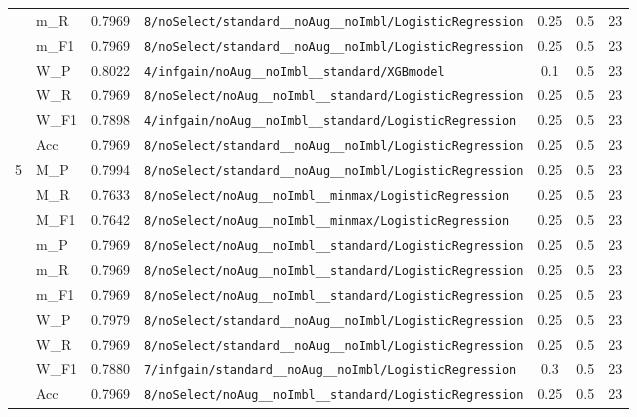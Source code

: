 \begin{table}[htbp]
\begin{tabular}{|c|l|c|>{\ttfamily\footnotesize}p{7.2cm}|c|c|c|}
 & m\_R & 0.7969 & \texttt{8/noSelect/standard\_\_noAug\_\_noImbl/LogisticRegression} & 0.25 & 0.5  & 23 \\ 
 & m\_F1 & 0.7969 & \texttt{8/noSelect/standard\_\_noAug\_\_noImbl/LogisticRegression} & 0.25 & 0.5  & 23 \\ 
 & W\_P & 0.8022 & \texttt{4/infgain/noAug\_\_noImbl\_\_standard/XGBmodel} & 0.1 & 0.5  & 23 \\ 
 & W\_R & 0.7969 & \texttt{8/noSelect/noAug\_\_noImbl\_\_standard/LogisticRegression} & 0.25 & 0.5  & 23 \\ 
 & W\_F1 & 0.7898 & \texttt{4/infgain/noAug\_\_noImbl\_\_standard/LogisticRegression} & 0.25 & 0.5  & 23 \\ 
 & Acc & 0.7969 & \texttt{8/noSelect/standard\_\_noAug\_\_noImbl/LogisticRegression} & 0.25 & 0.5  & 23 \\ 
\hline
\multirow{10}{*}{5} & M\_P & 0.7994 & \texttt{8/noSelect/standard\_\_noAug\_\_noImbl/LogisticRegression} & 0.25 & 0.5  & 23 \\ 
 & M\_R & 0.7633 & \texttt{8/noSelect/noAug\_\_noImbl\_\_minmax/LogisticRegression} & 0.25 & 0.5  & 23 \\ 
 & M\_F1 & 0.7642 & \texttt{8/noSelect/noAug\_\_noImbl\_\_minmax/LogisticRegression} & 0.25 & 0.5  & 23 \\ 
 & m\_P & 0.7969 & \texttt{8/noSelect/noAug\_\_noImbl\_\_standard/LogisticRegression} & 0.25 & 0.5  & 23 \\ 
 & m\_R & 0.7969 & \texttt{8/noSelect/noAug\_\_noImbl\_\_standard/LogisticRegression} & 0.25 & 0.5  & 23 \\ 
 & m\_F1 & 0.7969 & \texttt{8/noSelect/noAug\_\_noImbl\_\_standard/LogisticRegression} & 0.25 & 0.5  & 23 \\ 
 & W\_P & 0.7979 & \texttt{8/noSelect/standard\_\_noAug\_\_noImbl/LogisticRegression} & 0.25 & 0.5  & 23 \\ 
 & W\_R & 0.7969 & \texttt{8/noSelect/standard\_\_noAug\_\_noImbl/LogisticRegression} & 0.25 & 0.5  & 23 \\ 
 & W\_F1 & 0.7880 & \texttt{7/infgain/standard\_\_noAug\_\_noImbl/LogisticRegression} & 0.3 & 0.5  & 23 \\ 
 & Acc & 0.7969 & \texttt{8/noSelect/noAug\_\_noImbl\_\_standard/LogisticRegression} & 0.25 & 0.5  & 23 \\ 
\hline
\end{tabular}
\end{table}
